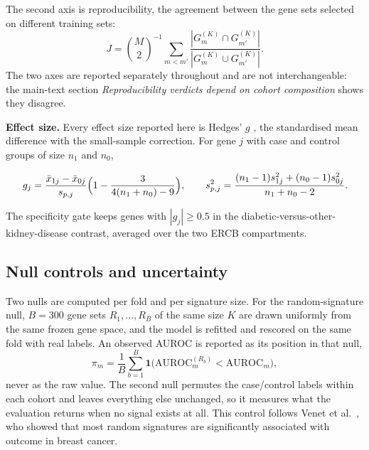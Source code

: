 \documentclass[11pt]{article}
\begin{document}
The second axis is reproducibility, the agreement between the gene sets selected on different training sets:
\begin{equation}
J = \binom{M}{2}^{-1} \sum_{m < m'}
\frac{|G_m^{(K)} \cap G_{m'}^{(K)}|}{|G_m^{(K)} \cup G_{m'}^{(K)}|} .
\label{eq:jaccard}
\end{equation}
The two axes are reported separately throughout and are not interchangeable: the main-text section \textit{Reproducibility verdicts depend on cohort composition} shows they disagree.

\textbf{Effect size.} Every effect size reported here is Hedges' $g$ \cite{hedges1981}, the standardised
mean difference with the small-sample correction. For gene $j$ with case and control
groups of size $n_1$ and $n_0$,

\begin{equation}
g_j = \frac{\bar{x}_{1j} - \bar{x}_{0j}}{s_{p,j}} \Bigl( 1 - \frac{3}{4(n_1 + n_0) - 9} \Bigr) , \qquad
s_{p,j}^{2} = \frac{(n_1 - 1) s_{1j}^{2} + (n_0 - 1) s_{0j}^{2}}{n_1 + n_0 - 2} .
\label{eq:hedges}
\end{equation}

The specificity gate keeps genes with $|g_j| \ge 0.5$ in the diabetic-versus-other-
kidney-disease contrast, averaged over the two ERCB compartments.


\label{note:S2}
\subsection{Null controls and uncertainty}\label{sec:nulls}

Two nulls are computed per fold and per signature size. For the random-signature null, $B = 300$ gene sets $R_1,\dots,R_B$ of the same size $K$ are drawn uniformly from the same frozen gene space, and the model is refitted and rescored on the same fold with real labels. An observed AUROC is reported as its position in that null,
\begin{equation}
\pi_m = \frac{1}{B} \sum_{b=1}^{B}
\mathbf{1}\bigl( \mathrm{AUROC}_m^{(R_b)} < \mathrm{AUROC}_m \bigr) ,
\label{eq:percentile}
\end{equation}
never as the raw value. The second null permutes the case/control labels within each cohort and leaves everything else unchanged, so it measures what the evaluation returns when no signal exists at all. This control follows Venet et al.\ \cite{venet2011}, who showed that most random signatures are significantly associated with outcome in breast cancer.
\end{document}
